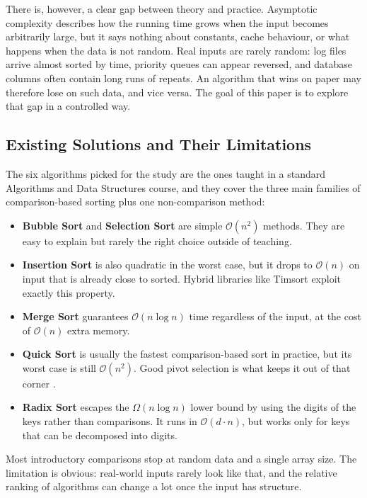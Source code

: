 \documentclass[11pt,a4paper]{article}
\begin{document}
There is, however, a clear gap between theory and practice. Asymptotic complexity describes how the running time grows when the input becomes arbitrarily large, but it says nothing about constants, cache behaviour, or what happens when the data is not random. Real inputs are rarely random: log files arrive almost sorted by time, priority queues can appear reversed, and database columns often contain long runs of repeats. An algorithm that wins on paper may therefore lose on such data, and vice versa. The goal of this paper is to explore that gap in a controlled way.

\subsection{Existing Solutions and Their Limitations}

The six algorithms picked for the study are the ones taught in a standard Algorithms and Data Structures course, and they cover the three main families of comparison-based sorting plus one non-comparison method:

\begin{itemize}[noitemsep]
  \item \textbf{Bubble Sort} and \textbf{Selection Sort} are simple $\mathcal{O}(n^2)$ methods. They are easy to explain but rarely the right choice outside of teaching.
  \item \textbf{Insertion Sort} is also quadratic in the worst case, but it drops to $\mathcal{O}(n)$ on input that is already close to sorted. Hybrid libraries like Timsort \cite{auger2019} exploit exactly this property.
  \item \textbf{Merge Sort} guarantees $\mathcal{O}(n \log n)$ time regardless of the input, at the cost of $\mathcal{O}(n)$ extra memory.
  \item \textbf{Quick Sort} is usually the fastest comparison-based sort in practice, but its worst case is still $\mathcal{O}(n^2)$. Good pivot selection is what keeps it out of that corner \cite{sedgewick2002}.
  \item \textbf{Radix Sort} escapes the $\Omega(n \log n)$ lower bound by using the digits of the keys rather than comparisons. It runs in $\mathcal{O}(d \cdot n)$, but works only for keys that can be decomposed into digits.
\end{itemize}

Most introductory comparisons stop at random data and a single array size. The limitation is obvious: real-world inputs rarely look like that, and the relative ranking of algorithms can change a lot once the input has structure.
\end{document}
